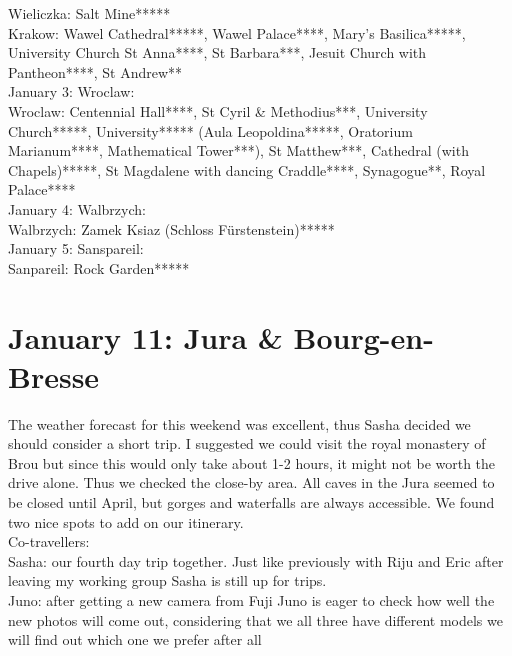 Wieliczka: Salt Mine*****\\
Krakow: Wawel Cathedral*****, Wawel Palace****, Mary's Basilica*****, University Church St Anna****, St Barbara***, Jesuit Church with Pantheon****, St Andrew**\\

January 3: Wroclaw:\\

Wroclaw: Centennial Hall****, St Cyril \& Methodius***, University Church*****, University***** (Aula Leopoldina*****, Oratorium Marianum****, Mathematical Tower***), St Matthew***, Cathedral (with Chapels)*****, St Magdalene with dancing Craddle****, Synagogue**, Royal Palace****\\

January 4: Walbrzych:\\

Walbrzych: Zamek Ksiaz (Schloss F\"urstenstein)*****\\

January 5: Sanspareil:\\

Sanpareil: Rock Garden*****\\

\section{January 11: Jura \& Bourg-en-Bresse}
\label{2020:BourgEnBresse}

The weather forecast for this weekend was excellent, thus Sasha decided we should consider a short trip. I suggested we could visit the royal monastery of Brou but since this would only take about 1-2 hours, it might not be worth the drive alone. Thus we checked the close-by area. All caves in the Jura seemed to be closed until April, but gorges and waterfalls are always accessible. We found two nice spots to add on our itinerary.\\

Co-travellers:\\
Sasha: our fourth day trip together. Just like previously with Riju and Eric after leaving my working group Sasha is still up for trips. \\

Juno: after getting a new camera from Fuji Juno is eager to check how well the new photos will come out, considering that we all three have different models we will find out which one we prefer after all\\

